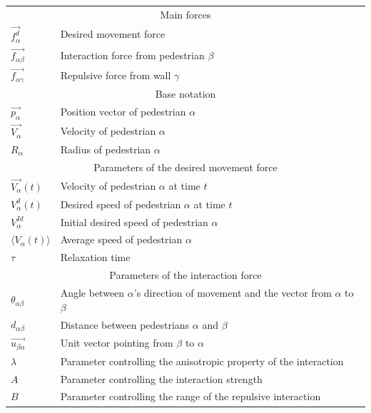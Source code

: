 \begin{table}[h]
    \centering
    \begin{tabular}{l l}
        \toprule
        \multicolumn{2}{c}{\textsf{Main forces}}\\
        $\overrightarrow{f_{\alpha}^{d}}$ & Desired movement force\\
        $\overrightarrow{f_{\alpha \beta}}$ & Interaction force from 
        pedestrian $\beta$\\
        $\overrightarrow{f_{\alpha \gamma}}$ & Repulsive force from wall 
        $\gamma$\\

        \midrule
        \multicolumn{2}{c}{\textsf{Base notation}}\\
        $\overrightarrow{p_{\alpha}}$ & Position vector of pedestrian 
        $\alpha$\\
        $\overrightarrow{V_{\alpha}}$ & Velocity of pedestrian $\alpha$ \\ 
        \addlinespace[0.3em]
        $R_\alpha$ & Radius of pedestrian $\alpha$\\

        \midrule
        \multicolumn{2}{c}{\textsf{Parameters of the desired movement force}}\\
        $\overrightarrow{V_{\alpha}}(t)$ & Velocity of pedestrian $\alpha$ 
        at time $t$\\
        $V_{\alpha}^{d}(t)$ & Desired speed of pedestrian $\alpha$ at time 
        $t$\\
        $V_{\alpha}^{Id}$ & Initial desired speed of pedestrian $\alpha$ \\
        $\langle V_{\alpha}(t) \rangle$ & Average speed of pedestrian 
        $\alpha$ \\
        $\tau$& Relaxation time \\

        \midrule
        \multicolumn{2}{c}{\textsf{Parameters of the interaction force}}\\
        $\theta_{\alpha \beta}$ & Angle between $\alpha$'s direction of 
        movement and the vector from $\alpha$ to $\beta$\\
        $d_{\alpha \beta}$& Distance between pedestrians $\alpha$ and $\beta$ \\
        $\overrightarrow{u_{\beta \alpha}}$& Unit vector pointing from $\beta$ to $\alpha$ \\
        $\lambda$& Parameter controlling the anisotropic property of the 
        interaction\\
        $A$& Parameter controlling the interaction strength \\
        $B$& Parameter controlling the range of the repulsive interaction  \\


\end{tabular}
\end{table}

